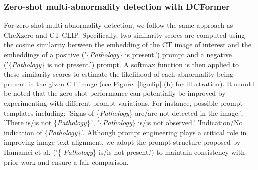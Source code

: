\subsubsection*{Zero-shot multi-abnormality detection with DCFormer}
For zero-shot multi-abnormality detection, we follow the same approach as CheXzero\cite{tiu2022expert} and CT-CLIP\cite{hamamci2024foundation}. Specifically, two similarity scores are computed using the cosine similarity between the embedding of the CT image of interest and the embeddings of a positive ('\{\textit{Pathology}\} is present.') prompt and a negative ('\{\textit{Pathology}\} is not present.') prompt. 
A softmax function is then applied to these similarity scores to estimate the likelihood of each abnormality being present in the given CT image (see Figure. \ref{fig:clip} (b) for illustration). It should be noted that the zero-shot performance can potentially be improved by experimenting with different prompt variations. For instance, possible prompt templates including: 'Signs of \{\textit{Pathology}\} are/are not detected in the image.', 'There is/is not \{\textit{Pathology}\}.', '\{\textit{Pathology}\} is/is not observed.' 'Indication/No indication of \{\textit{Pathology}\}.'.  Although prompt engineering plays a critical role in improving image-text alignment, we adopt the prompt structure proposed by Hamamci et al. \cite{hamamci2024foundation} ('\{ \textit{Pathology}\} is/is not present.') to maintain consistency with prior work and ensure a fair comparison.



